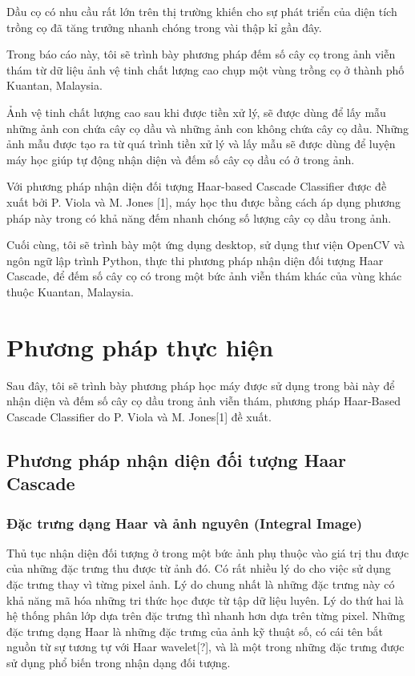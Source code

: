 \documentclass[14pt, oneside, a4paper, openany]{scrartcl}
\begin{document}
Dầu cọ có nhu cầu rất lớn trên thị trường khiến cho sự phát triển của diện tích trồng cọ đã tăng trưởng nhanh chóng trong vài thập kỉ gần đây.

Trong báo cáo này, tôi sẽ trình bày phương pháp đếm số cây cọ trong ảnh viễn thám từ dữ liệu ảnh vệ tinh chất lượng cao chụp một vùng trồng cọ ở thành phố Kuantan, Malaysia. 

Ảnh vệ tinh chất lượng cao sau khi được tiền xử lý, sẽ được dùng để lấy mẫu những ảnh con chứa cây cọ dầu và những ảnh con không chứa cây cọ dầu. Những ảnh mẫu được tạo ra từ quá trình tiền xử lý và lấy mẫu sẽ được dùng để luyện máy học giúp tự động nhận diện và đếm số cây cọ dầu có ở trong ảnh.

Với phương pháp nhận diện đối tượng Haar-based Cascade Classifier được đề xuất bởi P. Viola và M. Jones [1], máy học thu được bằng cách áp dụng phương pháp này trong có khả năng đếm nhanh chóng số lượng cây cọ dầu trong ảnh.

Cuối cùng, tôi sẽ trình bày một ứng dụng desktop, sử dụng thư viện OpenCV và ngôn ngữ lập trình Python, thực thi phương pháp nhận diện đối tượng Haar Cascade, để đếm số cây cọ có trong một bức ảnh viễn thám khác của vùng khác thuộc Kuantan, Malaysia.

\newpage
\section{Phương pháp thực hiện}
Sau đây, tôi sẽ trình bày phương pháp học máy được sử dụng trong bài này để nhận diện và đếm số cây cọ dầu trong ảnh viễn thám, phương pháp Haar-Based Cascade Classifier do  P. Viola và M. Jones[1] đề xuất.
\subsection{Phương pháp nhận diện đối tượng Haar Cascade}
\subsubsection{Đặc trưng dạng Haar và ảnh nguyên (Integral Image)}
Thủ tục nhận diện đối tượng ở trong một bức ảnh phụ thuộc vào giá trị thu được của những đặc trưng thu được từ ảnh đó. Có rất nhiều lý do cho việc sử dụng đặc trưng thay vì từng pixel ảnh. Lý do chung nhất là những đặc trưng này có khả năng mã hóa những tri thức học được từ tập dữ liệu luyên. Lý do thứ hai là hệ thống phân lớp dựa trên đặc trưng thì nhanh hơn dựa trên từng pixel.
Những đặc trưng dạng Haar là những đặc trưng của ảnh kỹ thuật số, có cái tên bắt nguồn từ sự tương tự với Haar wavelet[?], và là một trong những đặc trưng được sử dụng phổ biến trong nhận dạng đối tượng.
\end{document}
